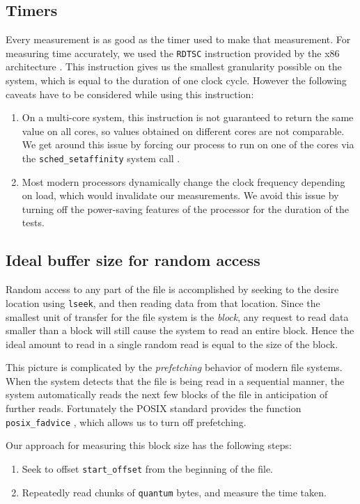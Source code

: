 \documentclass[twocolumn,11pt]{article}
\begin{document}
\begin{sloppypar}
\subsection{Timers}

Every measurement is as good as the timer used to make that measurement.
For measuring time accurately, we used the {\tt RDTSC} instruction
provided by the x86 architecture \cite{wiki_rdtsc}. This
instruction gives us the smallest granularity possible on the system,
which is equal to the duration of one clock cycle. However
the following caveats have to be considered while using this
instruction:
\begin{enumerate}
	\item On a multi-core system, this instruction is not guaranteed to
	return the same value on all cores, so values obtained on different
	cores are not comparable. We get around this issue by forcing our
	process to run on one of the cores via the {\tt sched\_setaffinity}
	system call \cite{sched_affinity}.
	\item Most modern processors dynamically change the clock frequency
	depending on load, which would invalidate our measurements. We avoid
	this issue by turning off the power-saving features of the processor
	for the duration of the tests.
\end{enumerate}

\subsection{Ideal buffer size for random access}

Random access to any part of the file is accomplished by seeking to the
desire location using {\tt lseek}, and then reading data from that location.
Since the smallest unit of transfer for the file system is the \textit{block},
any request to read data smaller than a block will still cause the system to
read an entire block. Hence the ideal amount to read in a single random read is
equal to the size of the block.

This picture is complicated by the \textit{prefetching} behavior of modern 
file systems. When the system detects that the file is being read in a 
sequential manner, the system automatically reads the next few blocks of the
file in anticipation of further reads. Fortunately the POSIX standard provides
the function {\tt posix\_fadvice} \cite{posix_fadvise}, which allows us to turn off 
prefetching.

Our approach for measuring this block size has the following steps:
\begin{enumerate}
	\item Seek to offset {\tt start\_offset} from the beginning of the file.
	\item Repeatedly read chunks of {\tt quantum} bytes, and measure the time taken.
\end{enumerate}


\end{sloppypar}
\end{document}
